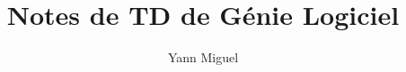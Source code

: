 \documentclass[12pt, a4paper]{article}
\title{Notes de TD de Génie Logiciel}
\author{Yann Miguel}
\begin{document}
\ttfamily
\maketitle
\tableofcontents
\newpage


\end{document}
